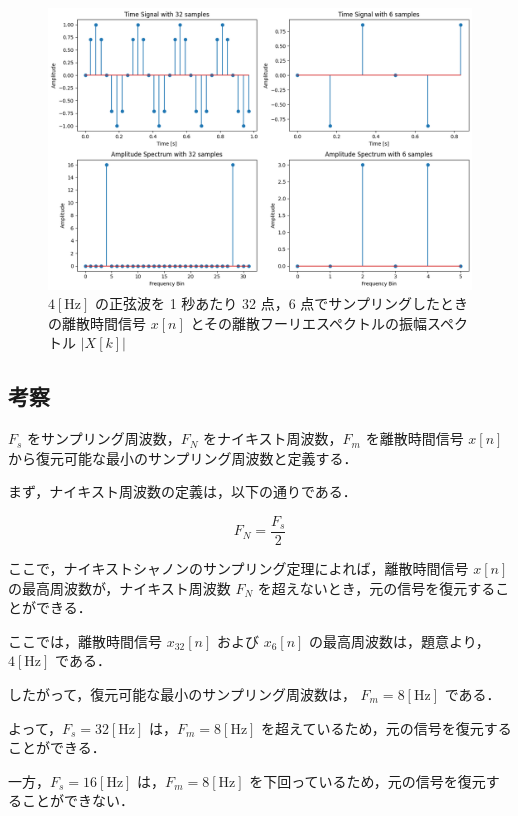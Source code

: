 \documentclass[fleqn, a4paper. 12pt]{jsarticle}
\begin{document}
  \begin{figure}[!h]
    \centering
    \includegraphics[width=1\textwidth]{fig_3_1.png}
    \caption{$4 [\mathrm{Hz}]$ の正弦波を 1 秒あたり 32 点，6 点でサンプリングしたときの離散時間信号 $x[n]$ とその離散フーリエスペクトルの振幅スペクトル $|X[k]|$}
    \label{fig:fig9}
  \end{figure}

  \subsection*{考察}

    $F_s$ をサンプリング周波数，$F_N$ をナイキスト周波数，$F_m$ を離散時間信号 $x[n]$ から復元可能な最小のサンプリング周波数と定義する．
    
    まず，ナイキスト周波数の定義は，以下の通りである．

    \begin{equation}
      F_N = \frac{F_s}{2}
    \end{equation}

    ここで，ナイキストシャノンのサンプリング定理によれば，離散時間信号 $x[n]$ の最高周波数が，ナイキスト周波数 $F_N$ を超えないとき，元の信号を復元することができる．

    ここでは，離散時間信号 $x_{32}[n]$ および $x_{6}[n]$ の最高周波数は，題意より，$4 [\mathrm{Hz}]$ である．

    したがって，復元可能な最小のサンプリング周波数は， $F_m = 8 [\mathrm{Hz}]$ である．

    よって，$F_s = 32 [\mathrm{Hz}]$ は，$F_m = 8 [\mathrm{Hz}]$ を超えているため，元の信号を復元することができる．
    
    一方，$F_s = 16 [\mathrm{Hz}]$ は，$F_m = 8 [\mathrm{Hz}]$ を下回っているため，元の信号を復元することができない．
\end{document}
